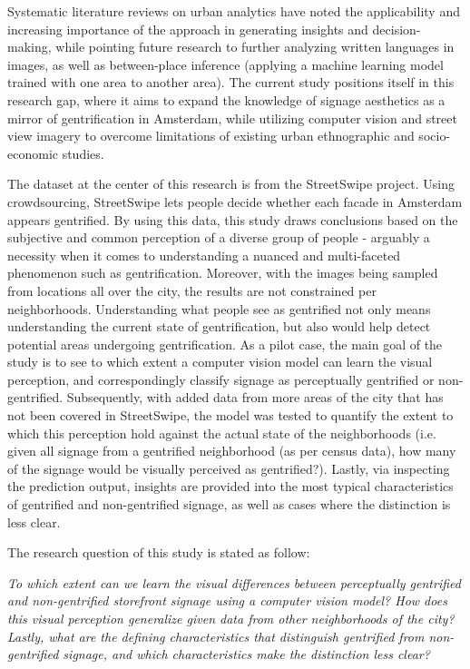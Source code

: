 Systematic literature reviews on urban analytics \cite{biljecki_street_2021, zhanga_urban_2023} have noted the applicability and increasing importance of the approach in generating insights and decision-making, while pointing future research to further analyzing written languages in images, as well as between-place inference (applying a machine learning model trained with one area to another area). The current study positions itself in this research gap, where it aims to expand the knowledge of signage aesthetics as a mirror of gentrification in Amsterdam, while utilizing computer vision and street view imagery to overcome limitations of existing urban ethnographic and socio-economic studies.

The dataset at the center of this research is from the StreetSwipe project. Using crowdsourcing, StreetSwipe \cite{streetswipe} lets people decide whether each facade in Amsterdam appears gentrified. By using this data, this study draws conclusions based on the subjective and common perception of a diverse group of people - arguably a necessity when it comes to understanding a nuanced and multi-faceted phenomenon such as gentrification. Moreover, with the images being sampled from locations all over the city, the results are not constrained per neighborhoods. Understanding what people see as gentrified not only means understanding the current state of gentrification, but also would help detect potential areas undergoing gentrification. As a pilot case, the main goal of the study is to see to which extent a computer vision model can learn the visual perception, and correspondingly classify signage as perceptually gentrified or non-gentrified. Subsequently, with added data from more areas of the city that has not been covered in StreetSwipe, the model was tested to quantify the extent to which this perception hold against the actual state of the neighborhoods (i.e. given all signage from a gentrified neighborhood (as per census data), how many of the signage would be visually perceived as gentrified?). Lastly, via inspecting the prediction output, insights are provided into the most typical characteristics of gentrified and non-gentrified signage, as well as cases where the distinction is less clear.

The research question of this study is stated as follow: 

\noindent\textit{To which extent can we learn the visual differences between perceptually gentrified and non-gentrified storefront signage using a computer vision model? How does this visual perception generalize given data from other neighborhoods of the city? Lastly, what are the defining characteristics that distinguish gentrified from non-gentrified signage, and which characteristics make the distinction less clear?}

